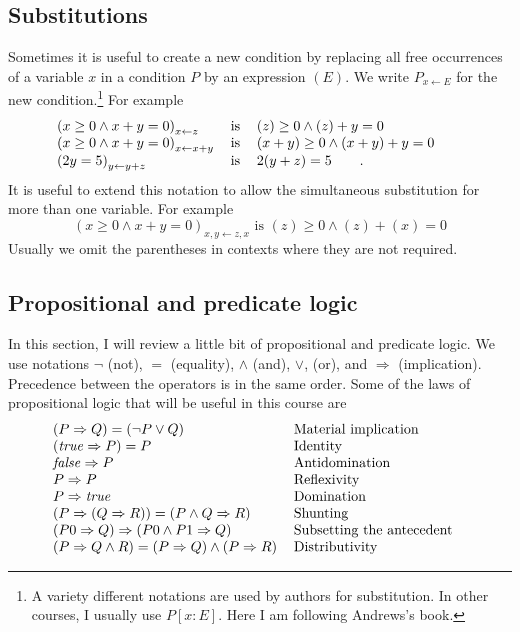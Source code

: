 \documentclass[11pt]{article}%
\begin{document}
\subsection{Substitutions}

Sometimes it is useful to create a new condition by replacing all free
occurrences of a variable $x$ in a condition $P$ by an expression $(E)$. We
write $P_{x\leftarrow E}$ for the new condition.\footnote{A variety different
notations are used by authors for substitution. In other courses, I usually
use $P[x:E]$. Here I am following Andrews's book.} For example%
\[%
\begin{tabular}
[c]{lll}%
$\left(  x\geq0\wedge x+y=0\right)  _{x\leftarrow z}$ & is & $\left(
z\right)  \geq0\wedge\left(  z\right)  +y=0$\\
$\left(  x\geq0\wedge x+y=0\right)  _{x\leftarrow x+y}$ & is & $\left(
x+y\right)  \geq0\wedge\left(  x+y\right)  +y=0$\\
$\left(  2y=5\right)  _{y\leftarrow y+z}$ & is & $2(y+z)=5\qquad\text{.}$%
\end{tabular}
\ \ \ \ \ \
\]
It is useful to extend this notation to allow the simultaneous substitution
for more than one variable. For example%
\[
\left(  x\geq0\wedge x+y=0\right)  _{x,y\leftarrow z,x}\text{ is }\left(
z\right)  \geq0\wedge\left(  z\right)  +\left(  x\right)  =0
\]
Usually we omit the parentheses in contexts where they are not required.

\subsection{Propositional and predicate logic}

In this section, I will review a little bit of propositional and predicate
logic. We use notations $\lnot$ (not), $=$ (equality), $\wedge$ (and), $\vee$,
(or), and $\Rightarrow$ (implication). Precedence between the operators is in
the same order. Some of the laws of propositional logic that will be useful in
this course are%
\[%
\begin{tabular}
[c]{ll}%
$\left(  P\Rightarrow Q\right)  =\left(  \lnot P\vee Q\right)  $ & Material
implication\\
$\left(  \mathit{true}\Rightarrow P\right)  =P$ & Identity\\
$\mathit{false}\Rightarrow P$ & Antidomination\\
$P\Rightarrow P$ & Reflexivity\\
$P\Rightarrow\mathit{true}$ & Domination\\
$\left(  P\Rightarrow(Q\Rightarrow R)\right)  =\left(  P\wedge Q\Rightarrow
R\right)  $ & Shunting\\
$\left(  P0\Rightarrow Q\right)  \Rightarrow\left(  P0\wedge P1\Rightarrow
Q\right)  $ & Subsetting the antecedent\\
$\left(  P\Rightarrow Q\wedge R\right)  =\left(  P\Rightarrow Q\right)
\wedge\left(  P\Rightarrow R\right)  $ & Distributivity
\end{tabular}
\ \ \
\]
\end{document}
